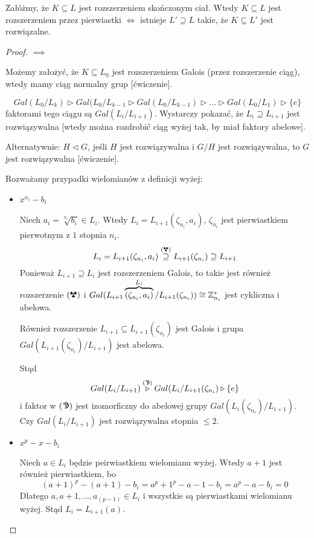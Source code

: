 \begin{theorem}
Załóżmy, że $K\subseteq L$ jest rozszerzeniem skończonym ciał. Wtedy $K\subseteq L$ jest rozszerzeniem przez pierwiastki $\iff$ istnieje $L'\supseteq L$ takie, że $K\subseteq L'$ jest rozwiązalne.
\end{theorem}
\begin{proof}
$\implies$

Możemy założyć, że $K\subseteq L_0$ jest rozszerzeniem Galois (przez rozszerzenie ciąg), wtedy mamy ciąg normalny grup [ćwiczenie].

$$Gal(L_0/L_k)\triangleright Gal(L_0/L_{k-1}\triangleright Gal(L_0/L_{k-1})\triangleright...\triangleright Gal(L_0/L_1)\triangleright\{e\}$$
faktorami tego ciągu są $Gal(L_i/L_{i+1})$. Wystarczy pokazać, że $L_i\supseteq L_{i+1}$ jest rozwiązywalna [wtedy można rozdrobić ciąg wyżej tak, by miał faktory abelowe].

Alternatywnie: $H\triangleleft G$, jeśli $H$ jest rozwiązywalna i $G/H$ jest rozwiązywalna, to $G$ jest rozwiązywalna [ćwiczenie].

Rozważamy przypadki wielomianów z definicji wyżej:
\begin{itemize}
    \item $x^{n_i}-b_i$

    Niech $a_i=\sqrt[n_i]{b_i}\in L_i$. Wtedy $L_i=L_{i+1}(\zeta_{n_i},a_i)$, $\zeta_{n_i}$ jest pierwiastkiem pierwotnym z $1$ stopnia $n_i$.
    $$L_i=L_{i+1}(\zeta_{n_i},a_i)\overset{\text{(\Radioactivity)}}{\supseteq} L_{i+1}(\zeta_{n_i})\supseteq L_{i+1}$$
    Ponieważ $L_{i+1}\supseteq L_i$ jest rozszerzeniem Galois, to takie jest również rozszerzenie $\text{(\Radioactivity)}$ i $Gal(L_{i+1}\overbrace{(\zeta_{n_i},a_i)}^{L_i}/L_{i+1}(\zeta_{n_i}))\cong\mathbb{Z}_{n_i}^*$ jest cykliczna i abelowa.

    Również rozszerzenie $L_{i+1}\subseteq L_{i+1}(\zeta_{n_i})$ jest Galois i grupa $Gal(L_{i+1}(\zeta_{n_i})/L_{i+1})$ jest abelowa.

    Stąd 
    $$Gal(L_i/L_{i+1})\overset{\text{(\Moon)}}\triangleright Gal(L_i/L_{i+1}(\zeta_{n_i})\triangleright\{e\}$$
    i faktor w $\text{(\Moon)}$ jest izomorficzny do abelowej grupy $Gal(L_i(\zeta_{n_i})/L_{i+1})$. Czy $Gal(L_i/L_{i+1})$ jest rozwiązywalna stopnia $\leq 2$.

    \item $x^p-x-b_i$

    Niech $a\in L_i$ będzie peirwiastkiem wielomianu wyżej. Wtedy $a+1$ jest również pierwiastkiem, bo 
    $$(a+1)^p-(a+1)-b_i=a^p+1^p-a-1-b_i=a^p-a-b_i=0$$
    Dlatego $a, a+1,...,a_(p-1)\in L_i$ i wszystkie są pierwiastkami wielomianu wyżej. Stąd $L_i=L_{i+1}(a)$.


\end{itemize}
\end{proof}
